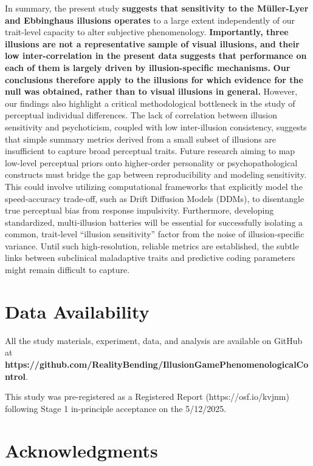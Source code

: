 \documentclass[
  man,
  floatsintext,
  longtable,
  nolmodern,
  notxfonts,
  notimes,
  colorlinks=true,linkcolor=blue,citecolor=blue,urlcolor=blue]{apa7}
\begin{document}
In summary, the present study \textbf{suggests that sensitivity to the
Müller-Lyer and Ebbinghaus illusions operates} to a large extent
independently of our trait-level capacity to alter subjective
phenomenology. \textbf{Importantly, three illusions are not a
representative sample of visual illusions, and their low
inter-correlation in the present data suggests that performance on each
of them is largely driven by illusion-specific mechanisms.} \textbf{Our
conclusions therefore apply to the illusions for which evidence for the
null was obtained, rather than to visual illusions in general.} However,
our findings also highlight a critical methodological bottleneck in the
study of perceptual individual differences. The lack of correlation
between illusion sensitivity and psychoticism, coupled with low
inter-illusion consistency, suggests that simple summary metrics derived
from a small subset of illusions are insufficient to capture broad
perceptual traits. Future research aiming to map low-level perceptual
priors onto higher-order personality or psychopathological constructs
must bridge the gap between reproducibility and modeling sensitivity.
This could involve utilizing computational frameworks that explicitly
model the speed-accuracy trade-off, such as Drift Diffusion Models
(DDMs), to disentangle true perceptual bias from response impulsivity.
Furthermore, developing standardized, multi-illusion batteries will be
essential for successfully isolating a common, trait-level ``illusion
sensitivity'' factor from the noise of illusion-specific variance. Until
such high-resolution, reliable metrics are established, the subtle links
between subclinical maladaptive traits and predictive coding parameters
might remain difficult to capture.

\section{Data Availability}\label{data-availability}

All the study materials, experiment, data, and analysis are available on
GitHub at
\textbf{https://github.com/RealityBending/IllusionGamePhenomenologicalControl}.

This study was pre-registered as a Registered Report
(https://osf.io/kvjnm) following Stage 1 in-principle acceptance on the
5/12/2025.

\section{Acknowledgments}\label{acknowledgments}
\end{document}
